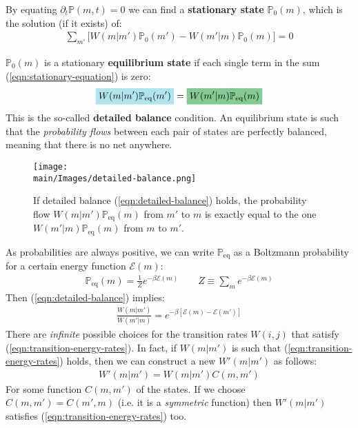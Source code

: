 \documentclass[../../main.tex]{subfiles}
\begin{document}
By equating $\partial_t \mathbb{P}(m,t) = 0$ we can find a \textbf{stationary state} $\mathbb{P}_0(m)$, which is the solution (if it exists) of:
\begin{align}\label{eqn:stationary-equation}
    \sum_{m'} \Big[W(m|m') \mathbb{P}_0(m') - W(m'|m) \mathbb{P}_0(m)\Big]  = 0
\end{align} 

$\mathbb{P}_0(m)$ is a stationary \textbf{equilibrium state} if each single term in the sum (\ref{eqn:stationary-equation}) is zero:
\begin{align}\label{eqn:detailed-balance}
    \hlc{SkyBlue}{W(m|m') \mathbb{P}_{\mathrm{eq}}(m')} = \hlc{ForestGreen}{W(m'|m) \mathbb{P}_{\mathrm{eq}}(m)} 
\end{align}
This is the so-called \textbf{detailed balance} condition. An equilibrium state is such that the \textit{probability flows} between each pair of states are perfectly balanced, meaning that there is no net  anywhere. 

\begin{figure}[H]
    \centering
    \texttt{[image: \\main/Images/detailed-balance.png]}
    \caption{If detailed balance (\ref{eqn:detailed-balance}) holds, the probability flow $W(m|m')\mathbb{P}_{\mathrm{eq}}(m)$ from $m'$ to $m$ is exactly equal to the one $W(m'|m)\mathbb{P}_{\mathrm{eq}}(m)$ from $m$ to $m'$.}
    \label{fig:detailed-balance}
\end{figure}

As probabilities are always positive, we can write $\mathbb{P}_{\mathrm{eq}}$ as a Boltzmann probability for a certain energy function $\mathcal{E}(m)$:
\begin{align*}
    \mathbb{P}_{\mathrm{eq}}(m) = \frac{1}{Z} e^{-\beta \mathcal{E}(m)} \qquad Z \equiv \sum_{m} e^{-\beta \mathcal{E}(m)}
\end{align*}
Then (\ref{eqn:detailed-balance}) implies:
\begin{align}\label{eqn:transition-energy-rates}
    \frac{W(m|m')}{W(m'|m)} = e^{-\beta [\mathcal{E}(m) - \mathcal{E}(m')]} 
\end{align}
There are \textit{infinite} possible choices for the transition rates $W(i,j)$ that satisfy (\ref{eqn:transition-energy-rates}). In fact, if $W(m|m')$ is such that (\ref{eqn:transition-energy-rates}) holds, then we can construct a new $W'(m|m')$ as follows:
\begin{align*}
    W'(m|m') = W(m|m') C(m,m')
\end{align*}
For some function $C(m,m')$ of the states. If we choose $C(m,m') = C(m',m)$ (i.e. it is a \textit{symmetric} function)
then $W'(m|m')$ satisfies (\ref{eqn:transition-energy-rates}) too.
\end{document}

